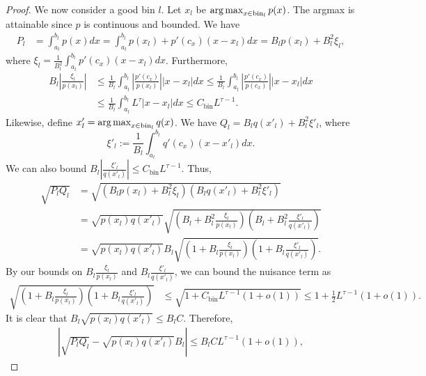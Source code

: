 \documentclass{article}
\newcommand{\bin}{\text{bin}}
\begin{document}
\begin{proof}
We now consider a good bin $l$. Let $x_l$ be $\argmax_{x \in \bin_l} p(x)$. The argmax is attainable since $p$ is continuous and bounded. We have
\begin{align*}
P_l &= \int_{a_l}^{b_l} p(x) dx = \int_{a_l}^{b_l} p(x_l) + p'(c_x)(x-x_l) dx = B_l p(x_l) + B_l^2 \xi_l,
\end{align*}
where $\xi_l = \frac{1}{B_l^2} \int_{a_l}^{b_l} p'(c_x)(x - x_l)dx$. Furthermore,
\begin{align*}
B_l \left| \frac{\xi_l}{p(x_l)} \right| 
   & \leq \frac{1}{B_l} \int_{a_l}^{b_l} \left|\frac{p'(c_x)}{p(x_l)} \right| |x - x_l| dx 
   \leq \frac{1}{B_l} \int_{a_l}^{b_l} \left|\frac{p'(c_x)}{p(c_x)} \right| |x - x_l| dx \\
   & \leq \frac{1}{B_l} \int_{a_l}^{b_l} L^{\tau} |x - x_l| dx \leq 
  C_\bin L^{\tau - 1}. 
\end{align*}
Likewise, define $x'_l = \argmax_{x \in \bin_l} q(x)$. We have $Q_l = B_l q(x'_l) + B_l^2 \xi'_l$,
where
\begin{equation*}
\xi'_l := \frac{1}{B_l} \int_{a_l}^{b_l} q'(c_x) (x - x'_l) dx.
\end{equation*}
We can also bound $B_l \left| \frac{\xi'_l}{q(x'_l)} \right| \leq C_{\bin} L^{\tau - 1}$.
Thus,
\begin{align*}
 \sqrt{P_l Q_l} &= \sqrt{ (B_l p(x_l) + B_l^2 \xi_l) 
                           (B_l q(x'_l) + B_l^2 \xi'_l) } \\
    &= \sqrt{p(x_l) q(x'_l)} \sqrt{ (B_l + B_l^2 \frac{\xi_l}{p(x_l)} ) 
                                           (B_l + B_l^2 \frac{\xi'_l}{q(x'_l)} ) } \\
   &=  \sqrt{p(x_l) q(x'_l)} B_l \sqrt{ (1 + B_l \frac{\xi_l}{p(x_l)} ) 
                                           (1 + B_l \frac{\xi'_l}{q(x'_l)} ) }.
\end{align*}
By our bounds on $ B_l \frac{\xi_l}{p(x_l)} $ and $B_l  \frac{\xi'_l}{q(x'_l)}$, we can bound the nuisance term as
\begin{align*}
 \sqrt{ (1 + B_l \frac{\xi_l}{p(x_l)} ) 
         (1 + B_l \frac{\xi'_l}{q(x'_l)} ) } &\leq \sqrt{ 1 + C_\bin L^{\tau - 1} (1+o(1))} \leq 1 + \frac{1}{2}  L^{\tau - 1} (1 + o(1)).
\end{align*}
It is clear that $B_l \sqrt{p(x_l)q(x'_l)} \leq B_l C$. Therefore,
\begin{align}
\label{eqn:discrete_riemann_bound2}
\left| \sqrt{ P_l Q_l} -  \sqrt{ p(x_l) q(x'_l)} B_l \right| \leq 
     B_l C  L^{\tau - 1}(1 + o(1)),
\end{align}

\end{proof}
\end{document}
